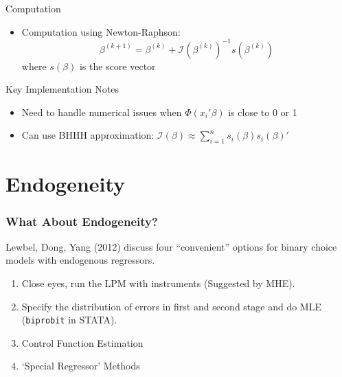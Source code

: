 \documentclass[11pt,dvipsnames,table,aspectratio=169]{beamer}
\begin{document}
\begin{frame}{Computation}
       \begin{itemize}
\item Computation using Newton-Raphson:
    \[ \beta^{(k+1)} = \beta^{(k)} + \mathcal{I}(\beta^{(k)})^{-1}s(\beta^{(k)}) \]
    where $s(\beta)$ is the score vector
\end{itemize}
\vspace{1em}
\begin{alertblock}{Key Implementation Notes}
\begin{itemize}
\item Need to handle numerical issues when $\Phi(x_i'\beta)$ is close to 0 or 1
\item Can use BHHH approximation: $\mathcal{I}(\beta) \approx \sum_{i=1}^n s_i(\beta)s_i(\beta)'$
\end{itemize}
\end{alertblock}

\end{frame}



\section{Endogeneity}

\begin{frame}
\frametitle{What About Endogeneity?}

Lewbel, Dong, Yang (2012) discuss four ``convenient'' options for binary choice models with endogenous regressors.
\begin{enumerate}
\item Close eyes, run the LPM with instruments (Suggested by MHE).
\item Specify the distribution of errors in first and second stage and do MLE (\texttt{biprobit} in STATA).
\item Control Function Estimation
\item `Special Regressor' Methods
\end{enumerate}
\end{frame}
\end{document}
